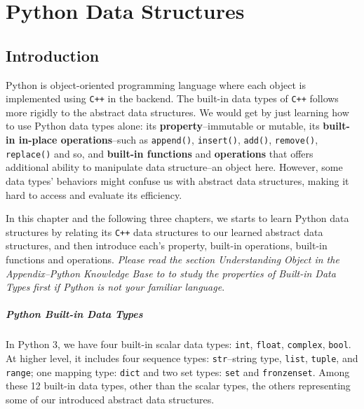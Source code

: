 \documentclass[../main.tex]{subfiles}
\begin{document}
\chapter{Python Data Structures}

\section{Introduction}
Python is object-oriented programming language where each object is implemented using \texttt{C++} in the backend. The built-in data types of \texttt{C++} follows more rigidly to the abstract data structures. We would get by just learning how to use Python data types alone: its \textbf{property}--immutable or mutable, its \textbf{built-in in-place operations}--such as \texttt{append()}, \texttt{insert()}, \texttt{add()}, \texttt{remove()}, \texttt{replace()} and so, and \textbf{built-in functions} and \textbf{operations} that offers additional ability to manipulate data structure--an object here. However, some data types' behaviors might confuse us with abstract data structures, making it hard to access and evaluate its efficiency. 

In this chapter and the following three chapters, we starts to learn Python data structures by relating its \texttt{C++} data structures to our learned abstract data structures, and then introduce each's property, built-in operations, built-in functions and operations. \textit{Please read the section Understanding Object in the Appendix--Python Knowledge Base to to study the properties of Built-in Data Types first if Python is not your familiar language}.

\paragraph{Python Built-in Data Types} In Python 3, we have four built-in scalar data types: \texttt{int}, \texttt{float}, \texttt{complex}, \texttt{bool}. At higher level, it includes four sequence types: \texttt{str}--string type, \texttt{list}, \texttt{tuple}, and \texttt{range}; one mapping type: \texttt{dict} and two set types: \texttt{set} and \texttt{fronzenset}. Among these 12 built-in data types, other than the scalar types, the others representing some of our introduced abstract data structures. 
\end{document}
